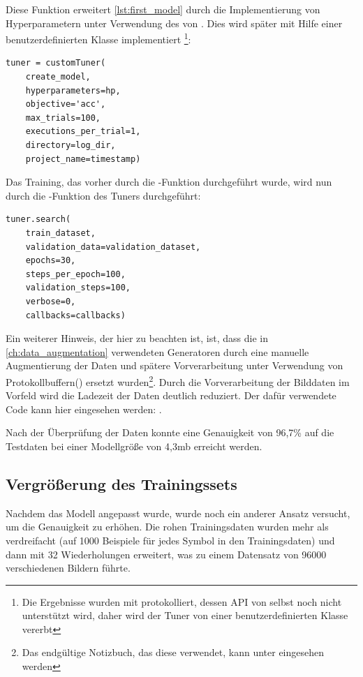 Diese Funktion erweitert \ref{lst:first_model} durch die Implementierung von Hyperparametern unter Verwendung des  von .
Dies wird später mit Hilfe einer benutzerdefinierten Klasse implementiert \footnote{Die Ergebnisse wurden mit  protokolliert, dessen API von  selbst noch nicht unterstützt wird, daher wird der Tuner von einer benutzerdefinierten Klasse vererbt}:

\begin{lstlisting}[caption={Definition des Modell-Tuners.}]
tuner = customTuner(
    create_model,
    hyperparameters=hp,
    objective='acc',
    max_trials=100,
    executions_per_trial=1,
    directory=log_dir,
    project_name=timestamp)
\end{lstlisting}

Das Training, das vorher durch die -Funktion durchgeführt wurde, wird nun durch die -Funktion des Tuners durchgeführt:

\begin{lstlisting}[caption={Suchen des besten Modells.}]
tuner.search(
    train_dataset,
    validation_data=validation_dataset,
    epochs=30,
    steps_per_epoch=100,
    validation_steps=100,
    verbose=0,
    callbacks=callbacks)
\end{lstlisting}

Ein weiterer Hinweis, der hier zu beachten ist, ist, dass die in \ref{ch:data_augmentation} verwendeten Generatoren durch eine manuelle Augmentierung der Daten und spätere Vorverarbeitung unter Verwendung von Protokollbuffern() ersetzt wurden\footnote{Das endgültige Notizbuch, das diese verwendet, kann unter  eingesehen werden}.
Durch die Vorverarbeitung der Bilddaten im Vorfeld wird die Ladezeit der Daten deutlich reduziert.
Der dafür verwendete Code kann hier eingesehen werden: .

Nach der Überprüfung der Daten konnte eine Genauigkeit von 96,7\% auf die Testdaten bei einer Modellgröße von 4,3mb erreicht werden.

\subsection{Vergrößerung des Trainingssets}

Nachdem das Modell angepasst wurde, wurde noch ein anderer Ansatz versucht, um die Genauigkeit zu erhöhen.
Die rohen Trainingsdaten wurden mehr als verdreifacht (auf 1000 Beispiele für jedes Symbol in den Trainingsdaten) und dann mit 32 Wiederholungen erweitert, was zu einem Datensatz von 96000 verschiedenen Bildern führte.

